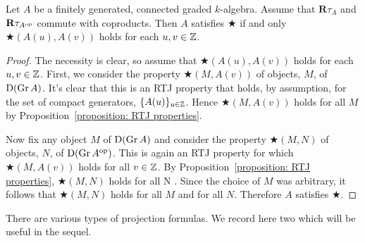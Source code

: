 \begin{proposition} \label{proposition: big star condition}
  Let \(A\) be a finitely generated, connected graded \(k\)-algebra.
  Assume that \(\mathbf{R}\tau_A\) and \(\mathbf{R}\tau_{A^{\operatorname{op}}}\) commute with coproducts. Then \(A\) satisfies \(\bigstar\) if and only \(\bigstar( A(u), A(v) )\) holds for each \(u,v \in \mathbb{Z}\).
\end{proposition}

\begin{proof}
  The necessity is clear, so assume that \(\bigstar(A(u), A(v))\) holds for each \(u,v \in \mathbb{Z}\).
  First, we consider the property \(\bigstar(M, A(v))\) of objects, \(M\), of \(\mathrm{D}(\operatorname{Gr}A)\).
  It's clear that this is an RTJ property that holds, by assumption, for the set of compact generators, \(\{A(u)\}_{u \in \mathbb{Z}}\).
  Hence \(\bigstar(M,A(v))\) holds for all \(M\) by Proposition~\ref{proposition: RTJ properties}.

  Now fix any object \(M\) of \(\mathrm{D}(\operatorname{Gr}A)\) and consider the property \(\bigstar(M, N)\) of objects, \(N\), of \(\mathrm{D}(\operatorname{Gr}A^{\operatorname{op}})\).
  This is again an RTJ property for which \(\bigstar(M,A(v))\) holds for all \(v \in \mathbb{Z}\).
  By Proposition~\ref{proposition: RTJ properties}, \(\bigstar(M,N)\) holds for all N .
  Since the choice of \(M\) was arbitrary, it follows that \(\bigstar(M,N)\) holds for all \(M\) and for all \(N\).
  Therefore \(A\) satisfies \(\bigstar\).
\end{proof}

There are various types of projection formulas.
We record here two which will be useful in the sequel.

